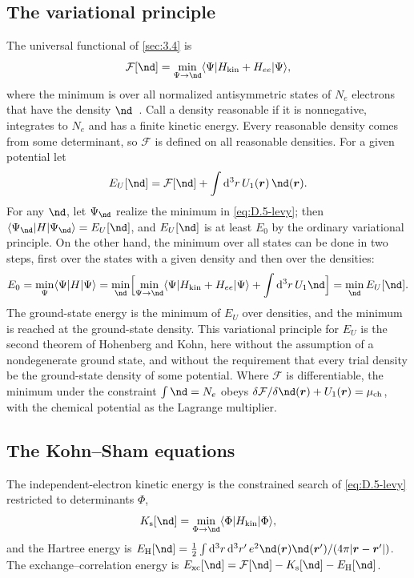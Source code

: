 \subsection{The variational principle}

The universal functional of \cref{sec:3.4} is
\begin{equation}
  \mathcal{F}[\nd] = \min_{\Psi\to\nd}\langle\Psi|H_{\mathrm{kin}} + H_{ee}|\Psi\rangle ,
  \label{eq:D.5-levy}
\end{equation}
where the minimum is over all normalized antisymmetric states of $N_e$ electrons that have the density $\nd$~\cite{levy1979universal}. Call a density reasonable if it is nonnegative, integrates to $N_e$ and has a finite kinetic energy. Every reasonable density comes from some determinant, so $\mathcal{F}$ is defined on all reasonable densities. For a given potential let
\begin{equation*}
  E_{U}[\nd] = \mathcal{F}[\nd] + \int\dd^3r\,U_1(\vect{r})\,\nd(\vect{r}) .
\end{equation*}
For any $\nd$, let $\Psi_{\nd}$ realize the minimum in \cref{eq:D.5-levy}; then $\langle\Psi_{\nd}|H|\Psi_{\nd}\rangle = E_U[\nd]$, and $E_U[\nd]$ is at least $E_0$ by the ordinary variational principle. On the other hand, the minimum over all states can be done in two steps, first over the states with a given density and then over the densities:
\begin{equation*}
  E_0 = \min_\Psi\langle\Psi|H|\Psi\rangle = \min_{\nd}\Bigl[\min_{\Psi\to\nd}\langle\Psi|H_{\mathrm{kin}} + H_{ee}|\Psi\rangle + \int\dd^3r\,U_1\nd\Bigr] = \min_{\nd}E_U[\nd] .
\end{equation*}
The ground-state energy is the minimum of $E_U$ over densities, and the minimum is reached at the ground-state density. This variational principle for $E_U$ is the second theorem of Hohenberg and Kohn, here without the assumption of a nondegenerate ground state, and without the requirement that every trial density be the ground-state density of some potential. Where $\mathcal{F}$ is differentiable, the minimum under the constraint $\int\nd = N_e$ obeys $\delta\mathcal{F}/\delta\nd(\vect{r}) + U_1(\vect{r}) = \mu_{\mathrm{ch}}$, with the chemical potential as the Lagrange multiplier.

\subsection{The Kohn--Sham equations}

The independent-electron kinetic energy is the constrained search of \cref{eq:D.5-levy} restricted to determinants $\Phi$,
\begin{equation*}
  K_{\mathrm{s}}[\nd] = \min_{\Phi\to\nd}\langle\Phi|H_{\mathrm{kin}}|\Phi\rangle ,
\end{equation*}
and the Hartree energy is $E_{\mathrm{H}}[\nd] = \tfrac12\int\dd^3r\,\dd^3r'\,e^2\nd(\vect{r})\nd(\vect{r}')/(4\pi|\vect{r} - \vect{r}'|)$. The exchange--correlation energy is $E_{\mathrm{xc}}[\nd] = \mathcal{F}[\nd] - K_{\mathrm{s}}[\nd] - E_{\mathrm{H}}[\nd]$.

